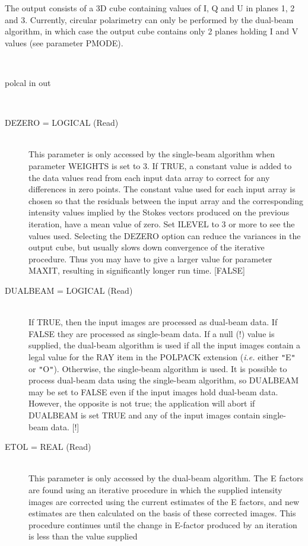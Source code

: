 \documentclass[twoside,11pt]{article}
\renewcommand{\_}{\texttt{\symbol{95}}}
\newcommand{\sstusage}[1]{\item[Usage:] \mbox{}
\\[1.3ex]{\raggedright \ssttt #1}}
\newcommand{\sstparameters}[1]{
   \item[Parameters:] \mbox{} \\
   \vspace{-3.5ex}
   \begin{description}
      #1
   \end{description}
}
\newcommand{\sstsubsection}[1]{ \item[{#1}] \mbox{} \\}
\newcommand{\sstusage}[1]{\item[Usage:]
      \begin{description}
         {\ssttt #1}
      \end{description}
      \\
   }
\newcommand{\sstparameters}[1]{
      \item[Parameters:] \\
      \begin{description}
         #1
      \end{description}
      \\
   }
\newcommand{\sstsubsection}[1]{\item[{#1}]}
\begin{document}
{{      The output consists of a 3D cube containing values of I, Q and U
      in planes 1, 2 and 3. Currently, circular polarimetry can only be
      performed by the dual-beam algorithm, in which case the output cube
      contains only 2 planes holding I and V values (see parameter PMODE).
   }
   \sstusage{
      polcal in out
   }
   \sstparameters{
      \sstsubsection{
         DEZERO = \_LOGICAL (Read)
      }{
         This parameter is only accessed by the single-beam algorithm
         when parameter WEIGHTS is set to 3. If TRUE, a constant value
         is added to the data values read from each input data array 
         to correct for any differences in zero points. The constant
         value used for each input array is chosen so that the residuals
         between the input array and the corresponding intensity values
         implied by the Stokes vectors produced on the previous iteration, 
         have a mean value of zero. Set ILEVEL to 3 or more to see the
         values used. Selecting the DEZERO option can
         reduce the variances in the output cube, but usually slows down 
         convergence of the iterative procedure. Thus you may have to give 
         a larger value for parameter MAXIT, resulting in significantly 
         longer run time. [FALSE]
      }
      \sstsubsection{
         DUALBEAM = \_LOGICAL (Read)
      }{
         If TRUE, then the input images are processed as dual-beam data.
         If FALSE they are processed as single-beam data. If a null (!)
         value is supplied, the dual-beam algorithm is used if all the input
         images contain a legal value for the RAY item in the POLPACK
         extension (\emph{i.e.} either {\tt "}E{\tt "} or {\tt "}O{\tt "}). Otherwise, the single-beam
         algorithm is used. It is possible to process dual-beam data using
         the single-beam algorithm, so DUALBEAM may be set to FALSE even
         if the input images hold dual-beam data. However, the opposite
         is not true; the application will abort if DUALBEAM is set TRUE and
         any of the input images contain single-beam data. [!]
      }
      \sstsubsection{
         ETOL = \_REAL (Read)
      }{
         This parameter is only accessed by the dual-beam algorithm. The E
         factors are found using an iterative procedure in which the supplied
         intensity images are corrected using the current estimates of the E
         factors, and new estimates are then calculated on the basis of these
         corrected images. This procedure continues until the change in
         E-factor produced by an iteration is less than the value supplied
}}}
\end{document}
